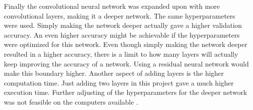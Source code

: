 Finally the convolutional neural network was expanded upon with more convolutional layers, making it a deeper network. The same hyperparameters were used. Simply making the network deeper actually gave a higher validation accuracy. An even higher accuracy might be achievable if the hyperparameters were optimized for this network. Even though simply making the network deeper resulted in a higher accuracy, there is a limit to how many layers will actually keep improving the accuracy of a network. Using a residual neural network would make this boundary higher. Another aspect of adding layers is the higher computation time. Just adding two layers in this project gave a much higher execution time. Further adjusting of the hyperparameters for the deeper network was not feasible on the computers available \citep{resnet}. 
